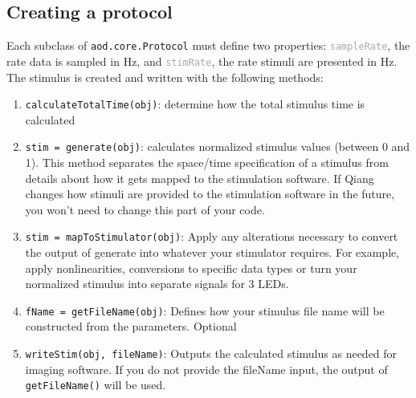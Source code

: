 \documentclass[10pt]{exam}
\newcommand\aodclass[1]{\textcolor{codeblue}{\texttt{#1}}}
\newcommand\aodprop[1]{\textcolor{darkgray}{\texttt{#1}}}
\newcommand\aodfcn[1]{\textcolor{darkteal}{\texttt{#1}}}
\begin{document}
	\subsection{Creating a protocol}
		\label{subsection:CreatingAProtocol}
		\noindent Each subclass of \aodclass{aod.core.Protocol} must define two properties: \aodprop{sampleRate}, the rate data is sampled in Hz, and \aodprop{stimRate}, the rate stimuli are presented in Hz.
		\\
		The stimulus is created and written with the following methods:
		\begin{enumerate}
			\item \aodfcn{calculateTotalTime(obj)}: determine how the total stimulus time is calculated
			\item \aodfcn{stim = generate(obj)}: calculates normalized stimulus values (between 0 and 1). This method separates the space/time specification of a stimulus from details about how it gets mapped to the stimulation software. If Qiang changes how stimuli are provided to the stimulation software in the future, you won't need to change this part of your code.
			\item \aodfcn{stim = mapToStimulator(obj)}: Apply any alterations necessary to convert the output of generate into whatever your stimulator requires. For example, apply nonlinearities, conversions to specific data types or turn your normalized stimulus into separate signals for 3 LEDs.
			\item \aodfcn{fName = getFileName(obj)}: Defines how your stimulus file name will be constructed from the parameters. Optional
			\item \aodfcn{writeStim(obj, fileName)}: Outputs the calculated stimulus as needed for imaging software. If you do not provide the fileName input, the output of \aodfcn{getFileName()} will be used.
		\end{enumerate}
	
\end{document}
